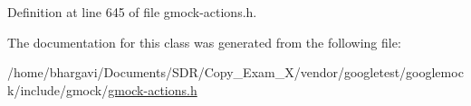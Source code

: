 Definition at line 645 of file gmock-\/actions.\+h.



The documentation for this class was generated from the following file\+:\begin{DoxyCompactItemize}
\item 
/home/bhargavi/\+Documents/\+S\+D\+R/\+Copy\+\_\+\+Exam\+\_\+X/vendor/googletest/googlemock/include/gmock/\hyperlink{gmock-actions_8h}{gmock-\/actions.\+h}\end{DoxyCompactItemize}
